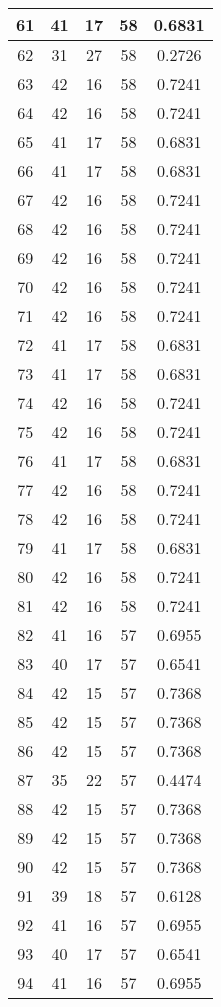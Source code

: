\documentclass[letterpaper, 12pt]{article}
\begin{document}
\begin{longtable}{|c|c|c|c|c|}
\hline
61 & 41 & 17 & 58 & 0.6831 \\
\hline
62 & 31 & 27 & 58 & 0.2726 \\
\hline
63 & 42 & 16 & 58 & 0.7241 \\
\hline
64 & 42 & 16 & 58 & 0.7241 \\
\hline
65 & 41 & 17 & 58 & 0.6831 \\
\hline
66 & 41 & 17 & 58 & 0.6831 \\
\hline
67 & 42 & 16 & 58 & 0.7241 \\
\hline
68 & 42 & 16 & 58 & 0.7241 \\
\hline
69 & 42 & 16 & 58 & 0.7241 \\
\hline
70 & 42 & 16 & 58 & 0.7241 \\
\hline
71 & 42 & 16 & 58 & 0.7241 \\
\hline
72 & 41 & 17 & 58 & 0.6831 \\
\hline
73 & 41 & 17 & 58 & 0.6831 \\
\hline
74 & 42 & 16 & 58 & 0.7241 \\
\hline
75 & 42 & 16 & 58 & 0.7241 \\
\hline
76 & 41 & 17 & 58 & 0.6831 \\
\hline
77 & 42 & 16 & 58 & 0.7241 \\
\hline
78 & 42 & 16 & 58 & 0.7241 \\
\hline
79 & 41 & 17 & 58 & 0.6831 \\
\hline
80 & 42 & 16 & 58 & 0.7241 \\
\hline
81 & 42 & 16 & 58 & 0.7241 \\
\hline
82 & 41 & 16 & 57 & 0.6955 \\
\hline
83 & 40 & 17 & 57 & 0.6541 \\
\hline
84 & 42 & 15 & 57 & 0.7368 \\
\hline
85 & 42 & 15 & 57 & 0.7368 \\
\hline
86 & 42 & 15 & 57 & 0.7368 \\
\hline
87 & 35 & 22 & 57 & 0.4474 \\
\hline
88 & 42 & 15 & 57 & 0.7368 \\
\hline
89 & 42 & 15 & 57 & 0.7368 \\
\hline
90 & 42 & 15 & 57 & 0.7368 \\
\hline
91 & 39 & 18 & 57 & 0.6128 \\
\hline
92 & 41 & 16 & 57 & 0.6955 \\
\hline
93 & 40 & 17 & 57 & 0.6541 \\
\hline
94 & 41 & 16 & 57 & 0.6955 \\

\end{longtable}
\end{document}
